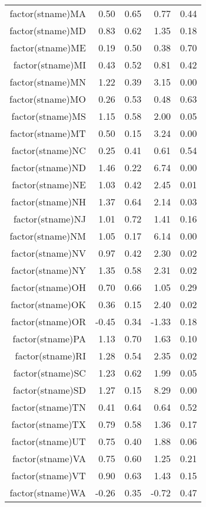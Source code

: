 \begin{table}[ht]
\begin{tabular}{rrrrr}
  factor(stname)MA & 0.50 & 0.65 & 0.77 & 0.44 \\ 
  factor(stname)MD & 0.83 & 0.62 & 1.35 & 0.18 \\ 
  factor(stname)ME & 0.19 & 0.50 & 0.38 & 0.70 \\ 
  factor(stname)MI & 0.43 & 0.52 & 0.81 & 0.42 \\ 
  factor(stname)MN & 1.22 & 0.39 & 3.15 & 0.00 \\ 
  factor(stname)MO & 0.26 & 0.53 & 0.48 & 0.63 \\ 
  factor(stname)MS & 1.15 & 0.58 & 2.00 & 0.05 \\ 
  factor(stname)MT & 0.50 & 0.15 & 3.24 & 0.00 \\ 
  factor(stname)NC & 0.25 & 0.41 & 0.61 & 0.54 \\ 
  factor(stname)ND & 1.46 & 0.22 & 6.74 & 0.00 \\ 
  factor(stname)NE & 1.03 & 0.42 & 2.45 & 0.01 \\ 
  factor(stname)NH & 1.37 & 0.64 & 2.14 & 0.03 \\ 
  factor(stname)NJ & 1.01 & 0.72 & 1.41 & 0.16 \\ 
  factor(stname)NM & 1.05 & 0.17 & 6.14 & 0.00 \\ 
  factor(stname)NV & 0.97 & 0.42 & 2.30 & 0.02 \\ 
  factor(stname)NY & 1.35 & 0.58 & 2.31 & 0.02 \\ 
  factor(stname)OH & 0.70 & 0.66 & 1.05 & 0.29 \\ 
  factor(stname)OK & 0.36 & 0.15 & 2.40 & 0.02 \\ 
  factor(stname)OR & -0.45 & 0.34 & -1.33 & 0.18 \\ 
  factor(stname)PA & 1.13 & 0.70 & 1.63 & 0.10 \\ 
  factor(stname)RI & 1.28 & 0.54 & 2.35 & 0.02 \\ 
  factor(stname)SC & 1.23 & 0.62 & 1.99 & 0.05 \\ 
  factor(stname)SD & 1.27 & 0.15 & 8.29 & 0.00 \\ 
  factor(stname)TN & 0.41 & 0.64 & 0.64 & 0.52 \\ 
  factor(stname)TX & 0.79 & 0.58 & 1.36 & 0.17 \\ 
  factor(stname)UT & 0.75 & 0.40 & 1.88 & 0.06 \\ 
  factor(stname)VA & 0.75 & 0.60 & 1.25 & 0.21 \\ 
  factor(stname)VT & 0.90 & 0.63 & 1.43 & 0.15 \\ 
  factor(stname)WA & -0.26 & 0.35 & -0.72 & 0.47 \\ 

\end{tabular}
\end{table}
